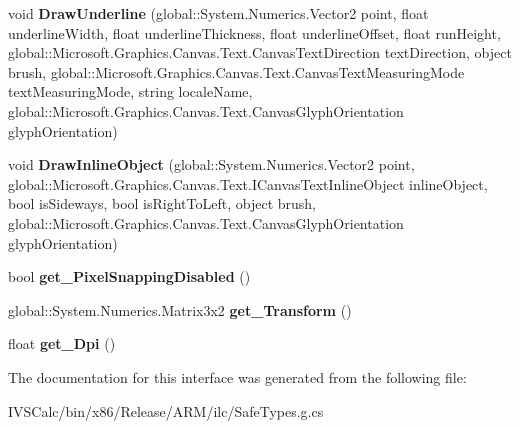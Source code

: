 \begin{DoxyCompactItemize}
\item 
\mbox{\label{interface_microsoft_1_1_graphics_1_1_canvas_1_1_text_1_1_i_canvas_text_renderer_a2e1cdd345444973833ad4a9f67ce1601}} 
void {\bfseries Draw\+Underline} (global\+::\+System.\+Numerics.\+Vector2 point, float underline\+Width, float underline\+Thickness, float underline\+Offset, float run\+Height, global\+::\+Microsoft.\+Graphics.\+Canvas.\+Text.\+Canvas\+Text\+Direction text\+Direction, object brush, global\+::\+Microsoft.\+Graphics.\+Canvas.\+Text.\+Canvas\+Text\+Measuring\+Mode text\+Measuring\+Mode, string locale\+Name, global\+::\+Microsoft.\+Graphics.\+Canvas.\+Text.\+Canvas\+Glyph\+Orientation glyph\+Orientation)
\item 
\mbox{\label{interface_microsoft_1_1_graphics_1_1_canvas_1_1_text_1_1_i_canvas_text_renderer_a4ee8342ead2546751b855325b3e50a38}} 
void {\bfseries Draw\+Inline\+Object} (global\+::\+System.\+Numerics.\+Vector2 point, global\+::\+Microsoft.\+Graphics.\+Canvas.\+Text.\+I\+Canvas\+Text\+Inline\+Object inline\+Object, bool is\+Sideways, bool is\+Right\+To\+Left, object brush, global\+::\+Microsoft.\+Graphics.\+Canvas.\+Text.\+Canvas\+Glyph\+Orientation glyph\+Orientation)
\item 
\mbox{\label{interface_microsoft_1_1_graphics_1_1_canvas_1_1_text_1_1_i_canvas_text_renderer_a47f1c1f5b81a4b3e71ddf01f64d0e1e9}} 
bool {\bfseries get\+\_\+\+Pixel\+Snapping\+Disabled} ()
\item 
\mbox{\label{interface_microsoft_1_1_graphics_1_1_canvas_1_1_text_1_1_i_canvas_text_renderer_a7a6a6deb82895cb39ac5fd578ed86cfd}} 
global\+::\+System.\+Numerics.\+Matrix3x2 {\bfseries get\+\_\+\+Transform} ()
\item 
\mbox{\label{interface_microsoft_1_1_graphics_1_1_canvas_1_1_text_1_1_i_canvas_text_renderer_a6dde43e44cf9d35e89b72e336e4aa41c}} 
float {\bfseries get\+\_\+\+Dpi} ()
\end{DoxyCompactItemize}


The documentation for this interface was generated from the following file\+:\begin{DoxyCompactItemize}
\item 
I\+V\+S\+Calc/bin/x86/\+Release/\+A\+R\+M/ilc/Safe\+Types.\+g.\+cs\end{DoxyCompactItemize}
